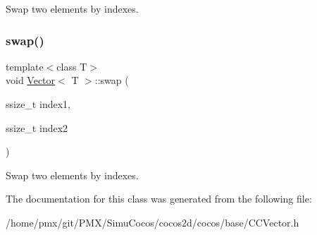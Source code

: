 Swap two elements by indexes. \mbox{\label{classVector_a42d2c65fb958b1cd850881c49c844e18}} 
\subsubsection{\texorpdfstring{swap()}{swap()}\hspace{0.1cm}{\footnotesize\ttfamily [4/4]}}
{\footnotesize\ttfamily template$<$class T$>$ \\
void \hyperlink{classVector}{Vector}$<$ T $>$\+::swap (\begin{DoxyParamCaption}\item[{ssize\+\_\+t}]{index1,  }\item[{ssize\+\_\+t}]{index2 }\end{DoxyParamCaption})\hspace{0.3cm}{\ttfamily [inline]}}

Swap two elements by indexes. 

The documentation for this class was generated from the following file\+:\begin{DoxyCompactItemize}
\item 
/home/pmx/git/\+P\+M\+X/\+Simu\+Cocos/cocos2d/cocos/base/C\+C\+Vector.\+h\end{DoxyCompactItemize}
